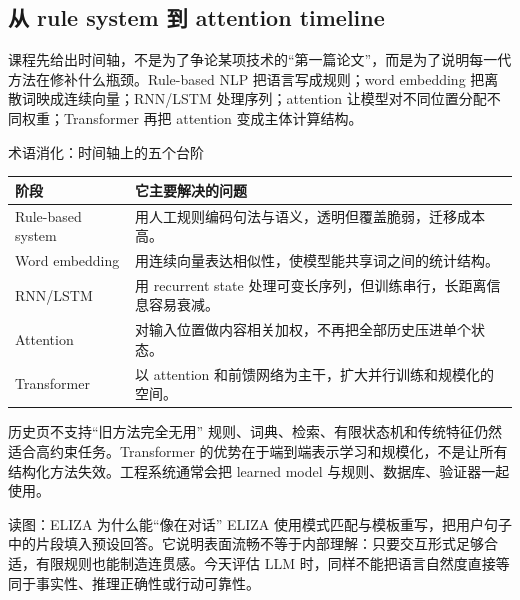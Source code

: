 \subsection{从 rule system 到 attention timeline}

课程先给出时间轴，不是为了争论某项技术的“第一篇论文”，而是为了说明每一代方法在修补什么瓶颈。Rule-based NLP 把语言写成规则；word embedding 把离散词映成连续向量；RNN/LSTM 处理序列；attention 让模型对不同位置分配不同权重；Transformer 再把 attention 变成主体计算结构。


\begin{knowledgebox}{术语消化：时间轴上的五个台阶}
\begin{tabularx}{\textwidth}{L{0.19\textwidth} X}
\toprule
阶段 & 它主要解决的问题 \\
\midrule
Rule-based system & 用人工规则编码句法与语义，透明但覆盖脆弱，迁移成本高。 \\
Word embedding & 用连续向量表达相似性，使模型能共享词之间的统计结构。 \\
RNN/LSTM & 用 recurrent state 处理可变长序列，但训练串行，长距离信息容易衰减。 \\
Attention & 对输入位置做内容相关加权，不再把全部历史压进单个状态。 \\
Transformer & 以 attention 和前馈网络为主干，扩大并行训练和规模化的空间。 \\
\bottomrule
\end{tabularx}
\end{knowledgebox}


\begin{warningbox}{历史页不支持“旧方法完全无用”}
规则、词典、检索、有限状态机和传统特征仍然适合高约束任务。Transformer 的优势在于端到端表示学习和规模化，不是让所有结构化方法失效。工程系统通常会把 learned model 与规则、数据库、验证器一起使用。
\end{warningbox}



\begin{knowledgebox}{读图：ELIZA 为什么能“像在对话”}
ELIZA 使用模式匹配与模板重写，把用户句子中的片段填入预设回答。它说明表面流畅不等于内部理解：只要交互形式足够合适，有限规则也能制造连贯感。今天评估 LLM 时，同样不能把语言自然度直接等同于事实性、推理正确性或行动可靠性。
\end{knowledgebox}

